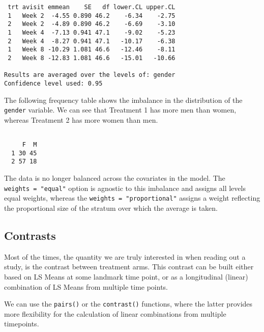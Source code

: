 \documentclass[
  letterpaper,
  DIV=11,
  numbers=noendperiod]{scrreprt}
\newenvironment{Shaded}{\begin{snugshade}}{\end{snugshade}}
\newcommand{\FunctionTok}[1]{\textcolor[rgb]{0.28,0.35,0.67}{#1}}
\newcommand{\NormalTok}[1]{\textcolor[rgb]{0.00,0.23,0.31}{#1}}
\newcommand{\SpecialCharTok}[1]{\textcolor[rgb]{0.37,0.37,0.37}{#1}}
\begin{document}
\begin{verbatim}
 trt avisit emmean    SE   df lower.CL upper.CL
 1   Week 2  -4.55 0.890 46.2    -6.34    -2.75
 2   Week 2  -4.89 0.890 46.2    -6.69    -3.10
 1   Week 4  -7.13 0.941 47.1    -9.02    -5.23
 2   Week 4  -8.27 0.941 47.1   -10.17    -6.38
 1   Week 8 -10.29 1.081 46.6   -12.46    -8.11
 2   Week 8 -12.83 1.081 46.6   -15.01   -10.66

Results are averaged over the levels of: gender 
Confidence level used: 0.95 
\end{verbatim}

The following frequency table shows the imbalance in the distribution of
the \texttt{gender} variable. We can see that Treatment 1 has more men
than women, whereas Treatment 2 has more women than men.

\begin{Shaded}
\end{Shaded}

\begin{verbatim}
   
     F  M
  1 30 45
  2 57 18
\end{verbatim}

The data is no longer balanced across the covariates in the model. The
\texttt{weights\ =\ "equal"} option is agnostic to this imbalance and
assigns all levels equal weights, whereas the
\texttt{weights\ =\ "proportional"} assigns a weight reflecting the
proportional size of the stratum over which the average is taken.

\hypertarget{contrasts}{%
\subsection{Contrasts}\label{contrasts}}

Most of the times, the quantity we are truly interested in when reading
out a study, is the contrast between treatment arms. This contrast can
be built either based on LS Means at some landmark time point, or as a
longitudinal (linear) combination of LS Means from multiple time points.

We can use the \texttt{pairs()} or the \texttt{contrast()} functions,
where the latter provides more flexibility for the calculation of linear
combinations from multiple timepoints.
\end{document}

